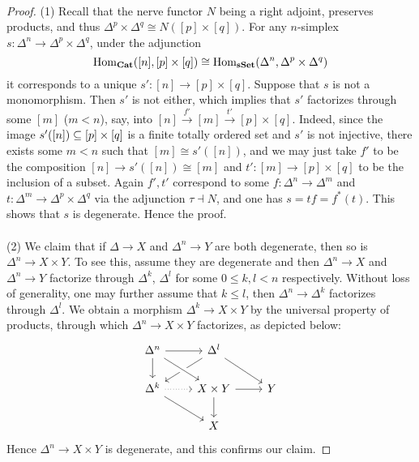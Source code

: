 \documentclass[a4paper,11pt,openany]{scrartcl}
\begin{document}
~\\
\begin{proof}
(1) Recall that the nerve functor $N$ being a right adjoint, preserves products, and thus $\Delta^p\times\Delta^q\cong N([p]\times[q])$. For any $n$-simplex $s\colon\Delta^n\to\Delta^p\times\Delta^q$, under the adjunction
\[
\operatorname{Hom}_{\operatorname{\mathbf{Cat}}}([n],[p]\times[q])\cong\operatorname{Hom}_{\operatorname{\mathbf{sSet}}}(\Delta^n,\Delta^p\times\Delta^q)
\]
it corresponds to a unique $s'\colon[n]\to[p]\times[q]$. Suppose that $s$ is not a monomorphism. Then $s'$ is not either, which implies that $s'$ factorizes through some $[m]$ ($m<n$), say, into $[n]\overset{f'}{\to}[m]\overset{t'}{\to}[p]\times[q]$. Indeed, since the image $s'([n])\subseteq[p]\times[q]$ is a finite totally ordered set and $s'$ is not injective, there exists some $m<n$ such that $[m]\cong s'([n])$, and we may just take $f'$ to be the composition $[n]\to s'([n])\cong[m]$ and $t'\colon[m]\to[p]\times[q]$ to be the inclusion of a subset. Again $f',t'$ correspond to some $f\colon\Delta^n\to\Delta^m$ and $t\colon\Delta^m\to\Delta^p\times\Delta^q$ via the adjunction $\tau\dashv N$, and one has $s=tf=f^*(t)$. This shows that $s$ is degenerate. Hence the proof.\\
\\
(2) We claim that if $\Delta\to X$ and $\Delta^n\to Y$ are both degenerate, then so is $\Delta^n\to X\times Y$. To see this, assume they are degenerate and then $\Delta^n\to X$ and $\Delta^n\to Y$ factorize through $\Delta^k$, $\Delta^l$ for some $0\leqslant k,l<n$ respectively. Without loss of generality, one may further assume that $k\leqslant l$, then $\Delta^n\to\Delta^k$ factorizes through $\Delta^l$. We obtain a morphism $\Delta^k\to X\times Y$ by the universal property of products, through which $\Delta^n\to X\times Y$ factorizes, as depicted below:
\[
\begin{tikzcd}
\Delta^n\arrow[r]\arrow[d]& \Delta^l\arrow[dr]\arrow[dl]&\\
\Delta^k\arrow[dr]\arrow[r,dotted]& X\times Y\arrow[r]\arrow[d]\arrow[from=ul,crossing over]& Y\\
& X&
\end{tikzcd}
\]
Hence $\Delta^n\to X\times Y$ is degenerate, and this confirms our claim.


\end{proof}
\end{document}
